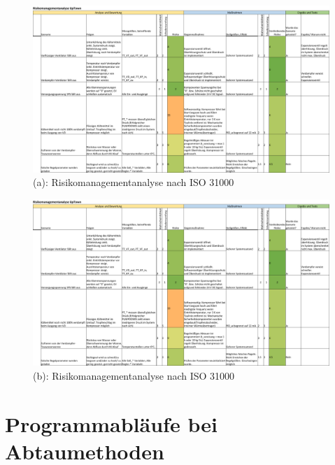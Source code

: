 \begin{figure}[htb]
\centering
\includegraphics[page= 1, width=1.35\textwidth, angle = 90]
{Pictures/Anhang/Riskikomanagementanalyse.pdf}
\caption{(a): Risikomanagementanalyse nach ISO 31000}
\label{fig:}
\end{figure}



\begin{figure}[htb]
\centering
\includegraphics[page=2, width=1.35\textwidth, angle = 90]
{Pictures/Anhang/Riskikomanagementanalyse.pdf}
\caption{(b): Risikomanagementanalyse nach ISO 31000}
\label{fig:}
\end{figure}


\chapter{Programmabläufe bei Abtaumethoden}

